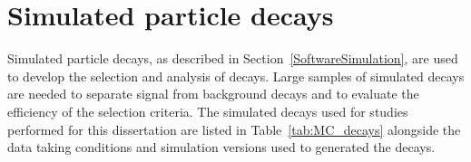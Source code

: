 \section{Simulated particle decays}
\label{sec:MCsamples}
Simulated particle decays, as described in Section~\ref{SoftwareSimulation}, are used to develop the selection and analysis of \bmumu decays. Large samples of simulated decays are needed to separate signal from background decays and to evaluate the efficiency of the selection criteria. 
The simulated decays used for studies performed for this dissertation are listed in Table~\ref{tab:MC_decays} alongside the data taking conditions and simulation versions used to generated the decays.



